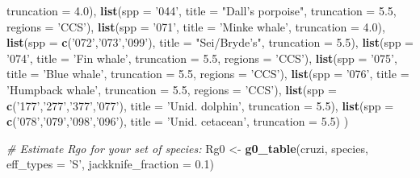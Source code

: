 \documentclass[
]{book}
\newenvironment{Shaded}{\begin{snugshade}}{\end{snugshade}}
\newcommand{\CommentTok}[1]{\textcolor[rgb]{0.56,0.35,0.01}{\textit{#1}}}
\newcommand{\DataTypeTok}[1]{\textcolor[rgb]{0.13,0.29,0.53}{#1}}
\newcommand{\FloatTok}[1]{\textcolor[rgb]{0.00,0.00,0.81}{#1}}
\newcommand{\KeywordTok}[1]{\textcolor[rgb]{0.13,0.29,0.53}{\textbf{#1}}}
\newcommand{\NormalTok}[1]{#1}
\newcommand{\StringTok}[1]{\textcolor[rgb]{0.31,0.60,0.02}{#1}}
\begin{document}
\begin{Shaded}
\begin{Highlighting}[]
       \DataTypeTok{truncation =} \FloatTok{4.0}\NormalTok{),}
  \KeywordTok{list}\NormalTok{(}\DataTypeTok{spp =} \StringTok{'044'}\NormalTok{,}
       \DataTypeTok{title =} \StringTok{"Dall's porpoise"}\NormalTok{,}
       \DataTypeTok{truncation =} \FloatTok{5.5}\NormalTok{,}
       \DataTypeTok{regions =} \StringTok{'CCS'}\NormalTok{),}
  \KeywordTok{list}\NormalTok{(}\DataTypeTok{spp =} \StringTok{'071'}\NormalTok{,}
       \DataTypeTok{title =} \StringTok{'Minke whale'}\NormalTok{,}
       \DataTypeTok{truncation =} \FloatTok{4.0}\NormalTok{),}
  \KeywordTok{list}\NormalTok{(}\DataTypeTok{spp =} \KeywordTok{c}\NormalTok{(}\StringTok{'072'}\NormalTok{,}\StringTok{'073'}\NormalTok{,}\StringTok{'099'}\NormalTok{),}
       \DataTypeTok{title =} \StringTok{"Sei/Bryde's"}\NormalTok{,}
       \DataTypeTok{truncation =} \FloatTok{5.5}\NormalTok{),}
  \KeywordTok{list}\NormalTok{(}\DataTypeTok{spp =} \StringTok{'074'}\NormalTok{,}
       \DataTypeTok{title =} \StringTok{'Fin whale'}\NormalTok{,}
       \DataTypeTok{truncation =} \FloatTok{5.5}\NormalTok{,}
       \DataTypeTok{regions =} \StringTok{'CCS'}\NormalTok{),}
  \KeywordTok{list}\NormalTok{(}\DataTypeTok{spp =} \StringTok{'075'}\NormalTok{,}
       \DataTypeTok{title =} \StringTok{'Blue whale'}\NormalTok{,}
       \DataTypeTok{truncation =} \FloatTok{5.5}\NormalTok{,}
       \DataTypeTok{regions =} \StringTok{'CCS'}\NormalTok{),}
   \KeywordTok{list}\NormalTok{(}\DataTypeTok{spp =} \StringTok{'076'}\NormalTok{,}
       \DataTypeTok{title =} \StringTok{'Humpback whale'}\NormalTok{,}
       \DataTypeTok{truncation =} \FloatTok{5.5}\NormalTok{,}
       \DataTypeTok{regions =} \StringTok{'CCS'}\NormalTok{),}
  \KeywordTok{list}\NormalTok{(}\DataTypeTok{spp =} \KeywordTok{c}\NormalTok{(}\StringTok{'177'}\NormalTok{,}\StringTok{'277'}\NormalTok{,}\StringTok{'377'}\NormalTok{,}\StringTok{'077'}\NormalTok{),}
       \DataTypeTok{title =} \StringTok{'Unid. dolphin'}\NormalTok{,}
       \DataTypeTok{truncation =} \FloatTok{5.5}\NormalTok{),}
  \KeywordTok{list}\NormalTok{(}\DataTypeTok{spp =} \KeywordTok{c}\NormalTok{(}\StringTok{'078'}\NormalTok{,}\StringTok{'079'}\NormalTok{,}\StringTok{'098'}\NormalTok{,}\StringTok{'096'}\NormalTok{),}
       \DataTypeTok{title =} \StringTok{'Unid. cetacean'}\NormalTok{,}
       \DataTypeTok{truncation =} \FloatTok{5.5}\NormalTok{)}
\NormalTok{  )}
\end{Highlighting}
\end{Shaded}

\begin{Shaded}
\begin{Highlighting}[]
\CommentTok{# Estimate Rgo for your set of species:  }
\NormalTok{Rg0 <-}
\StringTok{  }\KeywordTok{g0_table}\NormalTok{(cruzi,}
\NormalTok{           species,}
           \DataTypeTok{eff_types =} \StringTok{'S'}\NormalTok{,}
           \DataTypeTok{jackknife_fraction =} \FloatTok{0.1}\NormalTok{)}
\end{Highlighting}
\end{Shaded}
\end{document}
